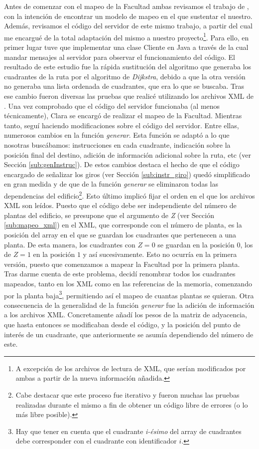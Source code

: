Antes de comenzar con el mapeo de la Facultad ambas revisamos el trabajo de \cite{TFGguia}, con la intención de encontrar un modelo de mapeo en el que sustentar el nuestro. Además, revisamos el código del servidor de este mismo trabajo, a partir del cual me encargué de la total adaptación del mismo a nuestro proyecto\footnote{A excepción de los archivos de lectura de XML, que serían modificados por ambas a partir de la nueva información añadida.}. Para ello, en primer lugar tuve que implementar una clase Cliente en Java a través de la cual mandar mensajes al servidor para observar el funcionamiento del código. El resultado de este estudio fue la rápida sustitución del algoritmo que generaba los cuadrantes de la ruta por el algoritmo de \textit{Dijkstra}, debido a que la otra versión no generaba una lista ordenada de cuadrantes, que era lo que se buscaba. Tras ese cambio fueron diversas las pruebas que realicé utilizando los archivos XML de \cite{TFGguia}. Una vez comprobado que el código del servidor funcionaba (al menos técnicamente), Clara se encargó de realizar el mapeo de la Facultad. Mientras tanto, seguí haciendo modificaciones sobre el código del servidor. Entre ellas, numerosos cambios en la función \textit{generar}. Esta función se adaptó a lo que nosotras buscábamos: instrucciones en cada cuadrante, indicación sobre la posición final del destino, adición de información adicional sobre la ruta, etc (ver Sección \ref{sub:genInstruc}). De estos cambios destaca el hecho de que el código encargado de señalizar los giros (ver Sección \ref{sub:instr_giro}) quedó simplificado en gran medida y de que de la función \textit{generar} se eliminaron todas las dependencias del edificio\footnote{Cabe destacar que este proceso fue iterativo y fueron muchas las pruebas realizadas durante el mismo a fin de obtener un código libre de errores (o lo más libre posible).}. Esto último implicó fijar el orden en el que los archivos XML son leídos. Puesto que el código debe ser independiente del número de plantas del edificio, se presupone que el argumento de \textit{Z} (ver Sección \ref{sub:mapeo_xml}) en el XML, que corresponde con el número de planta, es la posición del array en el que se guardan los cuadrantes que pertenecen a una planta. De esta manera, los cuadrantes con $Z = 0$ se guardan en la posición $0$, los de $Z = 1$ en la posición $1$ y así sucesivamente. Esto no ocurría en la primera versión, puesto que comenzamos a mapear la Facultad por la primera planta. Tras darme cuenta de este problema, decidí renombrar todos los cuadrantes mapeados, tanto en los XML como en las referencias de la memoria, comenzando por la planta baja\footnote{Hay que tener en cuenta que el cuadrante \textit{i-ésimo} del array de cuadrantes debe corresponder con el cuadrante con identificador $i$.}, permitiendo así el mapeo de cuantas plantas se quieran. Otra consecuencia de la generalidad de la función \textit{generar} fue la adición de información a los archivos XML. Concretamente añadí los pesos de la matriz de adyacencia, que hasta entonces se modificaban desde el código, y la posición del punto de interés de un cuadrante, que anteriormente se asumía dependiendo del número de este. 


